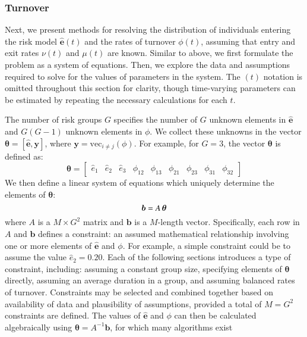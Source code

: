 \subsubsection{Turnover}\label{sss:params-turnover}
Next, we present methods for resolving
the distribution of individuals entering the risk model $\bm{\hat{e}}(t)$ and
the rates of turnover $\phi(t)$,
assuming that entry and exit rates $\nu(t)$ and $\mu(t)$ are known.
Similar to above, we first formulate the problem as a system of equations.
Then, we explore the data and assumptions required
to solve for the values of parameters in the system.
The $(t)$ notation is omitted throughout this section for clarity,
though time-varying parameters can be estimated by
repeating the necessary calculations for each $t$.
\par
The number of risk groups $G$ specifies the number of
$G$ unknown elements in $\bm{\hat{e}}$ and $G(G-1)$ unknown elements in $\phi$.
We collect these unknowns in the vector
$\bm{\theta} = \left[\bm{\hat{e}}, \bm{y}\right]$,
where $\bm{y} = \mathrm{vec}_{i \ne j}(\phi)$.
For example, for $G = 3$, the vector $\bm{\theta}$ is defined as:
\begin{equation}
\bm{\theta} = \left[
\begin{array}{ccccccccc}
\hat{e}_1 & \hat{e}_2 & \hat{e}_3 & \phi_{12} & \phi_{13} & \phi_{21} & \phi_{23} & \phi_{31} & \phi_{32}
\end{array}\right]
\end{equation}
We then define a linear system of equations
which uniquely determine the elements of $\bm{\theta}$:
\begin{equation}\label{eq:system-matrix}
\bm{b} = A \thinspace \bm{\theta}
\end{equation}
where $A$ is a $M \times G^2$ matrix
and $\bm{b}$ is a $M$-length vector.
Specifically, each row in $A$ and $\bm{b}$ defines a constraint:
an assumed mathematical relationship involving one or more elements of
$\bm{\hat{e}}$ and $\phi$.
For example, a simple constraint could be to assume the value $\hat{e}_2 = 0.20$.
Each of the following sections introduces a type of constraint, including:
assuming a constant group size,
specifying elements of $\bm{\theta}$ directly,
assuming an average duration in a group,
and assuming balanced rates of turnover.
Constraints may be selected and combined together based on
availability of data and plausibility of assumptions,
provided a total of $M = G^2$ constraints are defined.
The values of $\bm{\hat{e}}$ and $\phi$
can then be calculated algebraically using $\bm{\theta} = A^{-1}\bm{b}$,
for which many algorithms exist~\citep{LAPACK}
